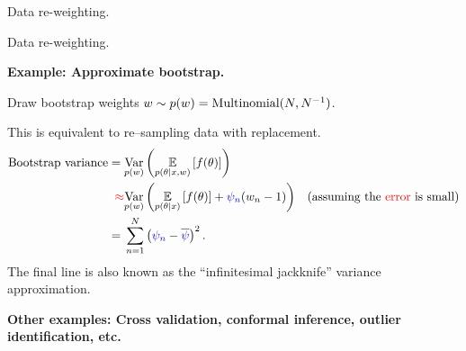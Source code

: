 \begin{frame}{Data re-weighting.}
%
\end{frame}





\begin{frame}[t]{Data re-weighting.}

    
    
    \textbf{Example: Approximate bootstrap.}
    
    Draw bootstrap
    weights $w \sim p(w) = \textrm{Multinomial}(N, N^{-1})$.

    This is equivalent to re--sampling data with replacement.
    \pause
    \begin{align*}
    \textrm{Bootstrap variance} ={}&
    \underset{p(w)}{\mathrm{Var}}\left(\underset{p(\theta \vert x, w)}{\mathbb{E}}\left[f(\theta)\right]\right) 
    \\\textcolor{red}{\approx}{}&
      \underset{p(w)}{\mathrm{Var}}\left(\underset{p(\theta \vert x)}{\mathbb{E}}\left[f(\theta)\right] + \textcolor{blue}{\psi_n}(w_n - 1)\right) 
    & \textrm{(assuming the \textcolor{red}{error} is small)}
    \\={}& \sum_{n=1}^N \left(\textcolor{blue}{\psi_n} - \overline{\textcolor{blue}{\psi}}\right)^2.
    \end{align*}
%
The final line is also known as the ``infinitesimal jackknife''
variance approximation.

\vspace{2em}
\pause
\textbf{Other examples: Cross validation, conformal inference, outlier identification, etc. }


\end{frame}
    



